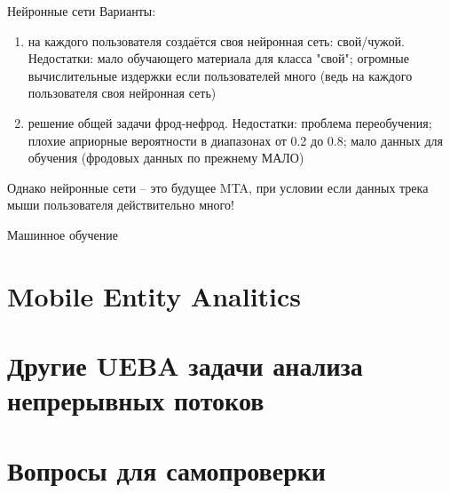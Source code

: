 \begin{frame}{Нейронные сети}
	Варианты:
	\begin{enumerate}
		\item на каждого пользователя создаётся своя нейронная сеть: свой/чужой.
		Недостатки: мало обучающего материала для класса "свой";
		огромные вычислительные издержки если пользователей много 
		(ведь на каждого пользователя своя нейронная сеть)
		\item решение общей задачи фрод-нефрод.
		Недостатки: проблема переобучения; плохие априорные вероятности в 
		диапазонах от 0.2 до 0.8;
		мало данных для обучения (фродовых данных по прежнему МАЛО)
	\end{enumerate}

	Однако нейронные сети -- это будущее MTA, при условии если данных 
	трека мыши пользователя действительно много!
\end{frame}

\begin{frame}{Машинное обучение}

\end{frame}


\section{Mobile Entity Analitics}\label{section:mea}

\section{Другие UEBA задачи анализа непрерывных потоков}\label{section:ueba_other}

\section{Вопросы для самопроверки}

